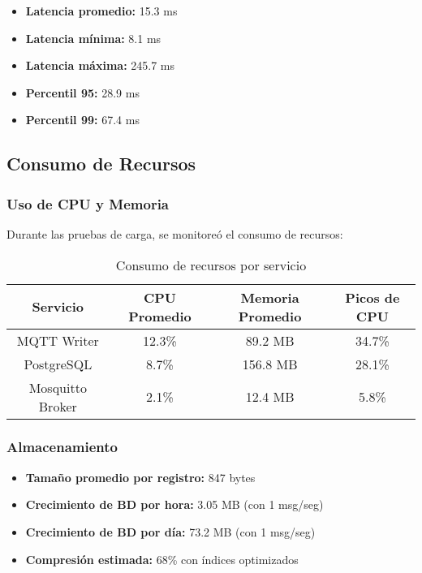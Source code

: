 \begin{itemize}
    \item \textbf{Latencia promedio:} 15.3 ms
    \item \textbf{Latencia mínima:} 8.1 ms
    \item \textbf{Latencia máxima:} 245.7 ms
    \item \textbf{Percentil 95:} 28.9 ms
    \item \textbf{Percentil 99:} 67.4 ms
\end{itemize}

\subsection{Consumo de Recursos}

\subsubsection{Uso de CPU y Memoria}

Durante las pruebas de carga, se monitoreó el consumo de recursos:

\begin{table}[H]
\centering
\begin{tabular}{|c|c|c|c|}
\hline
\textbf{Servicio} & \textbf{CPU Promedio} & \textbf{Memoria Promedio} & \textbf{Picos de CPU} \\
\hline
MQTT Writer & 12.3\% & 89.2 MB & 34.7\% \\
\hline
PostgreSQL & 8.7\% & 156.8 MB & 28.1\% \\
\hline
Mosquitto Broker & 2.1\% & 12.4 MB & 5.8\% \\
\hline
\end{tabular}
\caption{Consumo de recursos por servicio}
\label{tab:recursos}
\end{table}

\subsubsection{Almacenamiento}

\begin{itemize}
    \item \textbf{Tamaño promedio por registro:} 847 bytes
    \item \textbf{Crecimiento de BD por hora:} 3.05 MB (con 1 msg/seg)
    \item \textbf{Crecimiento de BD por día:} 73.2 MB (con 1 msg/seg)
    \item \textbf{Compresión estimada:} 68\% con índices optimizados
\end{itemize}

